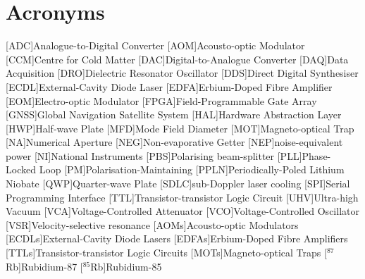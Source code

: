
\nocite{*}
%


\chapter*{Acronyms}
\begin{acronym}
        [ADC]{Analogue-to-Digital Converter}
        [AOM]{Acousto-optic Modulator}
        [CCM]{Centre for Cold Matter}
        [DAC]{Digital-to-Analogue Converter}
        [DAQ]{Data Acquisition}
        [DRO]{Dielectric Resonator Oscillator}
        [DDS]{Direct Digital Synthesiser}
        [ECDL]{External-Cavity Diode Laser}
        [EDFA]{Erbium-Doped Fibre Amplifier}
        [EOM]{Electro-optic Modulator}
        [FPGA]{Field-Programmable Gate Array}
        [GNSS]{Global Navigation Satellite System}
        [HAL]{Hardware Abstraction Layer}
        [HWP]{Half-wave Plate}
        [MFD]{Mode Field Diameter}
        [MOT]{Magneto-optical Trap}
        [NA]{Numerical Aperture}
        [NEG]{Non-evaporative Getter}
        [NEP]{noise-equivalent power}
        [NI]{National Instruments}
        [PBS]{Polarising beam-splitter}
        [PLL]{Phase-Locked Loop}
        [PM]{Polarisation-Maintaining}
        [PPLN]{Periodically-Poled Lithium Niobate}
        [QWP]{Quarter-wave Plate}
        [SDLC]{sub-Doppler laser cooling}
        [SPI]{Serial Programming Interface}
        [TTL]{Transistor-transistor Logic Circuit}
        [UHV]{Ultra-high Vacuum}
        [VCA]{Voltage-Controlled Attenuator}
        [VCO]{Voltage-Controlled Oscillator}
        [VSR]{Velocity-selective resonance}
        [AOMs]{Acousto-optic Modulators}
        [ECDLs]{External-Cavity Diode Lasers}
        [EDFAs]{Erbium-Doped Fibre Amplifiers}
        [TTLs]{Transistor-transistor Logic Circuits}
        [MOTs]{Magneto-optical Traps}
        [\(^{87}\)Rb]{Rubidium-87}
        [\(^{85}\)Rb]{Rubidium-85}
    \end{acronym}


